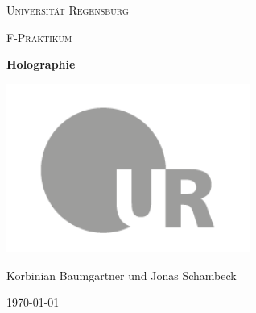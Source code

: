 \begin{titlepage}
	\centering
	{\scshape \LARGE Universität Regensburg \par}
	\vspace{1cm}
	{\scshape\Large F-Praktikum\par}
	\vspace{1.5cm}
	{\huge\bfseries Holographie\par}
	\vspace{2cm}
	\includegraphics[width=0.6\textwidth]{Abb/ur-logo-bildmarke-grau.png}\par
	\vfill
	{\large Korbinian Baumgartner und Jonas Schambeck\par}

	\vfill

	{\large \today\par}
\end{titlepage}
